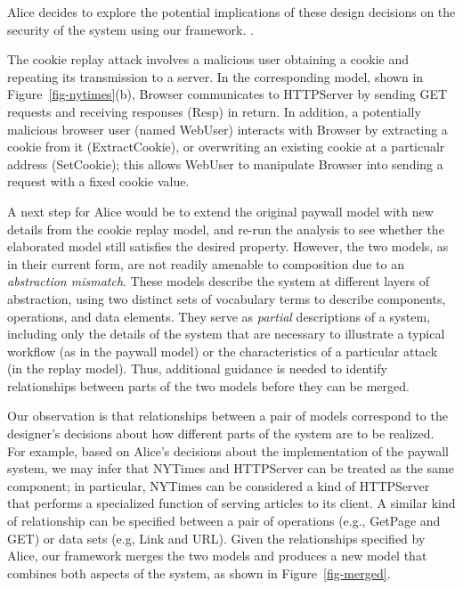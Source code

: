 Alice decides to explore the potential implications of these design
decisions on the security of the system using our framework.   .

The cookie replay attack involves a malicious user obtaining a cookie
and repeating its transmission to a server.  In the corresponding
model, shown in Figure~\ref{fig-nytimes}(b), \textsf{Browser}
communicates to \textsf{HTTPServer} by sending \textsf{GET} requests
and receiving responses (\textsf{Resp}) in return. In addition, a
potentially malicious browser user (named \textsf{WebUser}) interacts
with \textsf{Browser} by extracting a cookie from it
(\textsf{ExtractCookie}), or overwriting an existing cookie at a
particualr address (\textsf{SetCookie}); this allows \textsf{WebUser}
to manipulate \textsf{Browser} into sending a request with a fixed
cookie value.

A next step for Alice would be to extend the original paywall model
with new details from the cookie replay model, and re-run the analysis
to see whether the elaborated model still satisfies the desired
property. However, the two models, as in their current form, are not
readily amenable to composition due to an \textit{abstraction
  mismatch}. These models describe the system at different layers of
abstraction, using two distinct sets of vocabulary terms to describe
components, operations, and data elements. They serve as \textit{partial}
descriptions of a system, including only the details of the system
that are necessary to illustrate a typical workflow (as in the paywall
model) or the characteristics of a particular attack (in the replay
model). Thus, additional guidance is needed to identify relationships
between parts of the two models before they can be merged.

Our observation is that relationships between a pair of models
correspond to the designer's decisions about how different parts of
the system are to be realized. For example, based on Alice's decisions
about the implementation of the paywall system, we may infer that
\textsf{NYTimes} and \textsf{HTTPServer} can be treated as the same
component; in particular, \textsf{NYTimes} can be considered a kind of
\textsf{HTTPServer} that performs a specialized function of serving
articles to its client. A similar kind of relationship can be
specified between a pair of operations (e.g., \textsf{GetPage} and
\textsf{GET}) or data sets (e.g, \textsf{Link} and \textsf{URL}). Given
the relationships specified by Alice, our framework merges the two
models and produces a new model that combines both aspects of the
system, as shown in Figure~\ref{fig-merged}.

